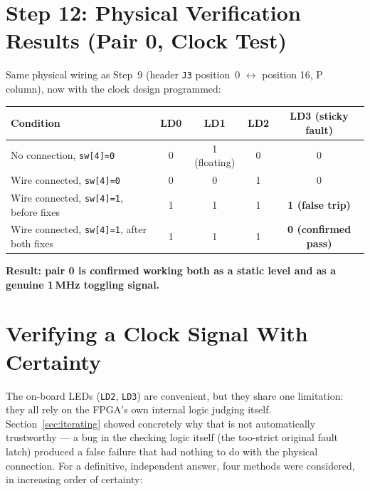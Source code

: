 \documentclass[11pt]{article}
\begin{document}
\section{Step 12: Physical Verification Results (Pair 0, Clock Test)}

Same physical wiring as Step~9 (header \texttt{J3} position~0 $\leftrightarrow$ position
16, P column), now with the clock design programmed:

\begin{center}
\begin{tabular}{@{}lcccc@{}}
\toprule
\textbf{Condition} & \textbf{LD0} & \textbf{LD1} & \textbf{LD2} & \textbf{LD3 (sticky fault)} \\
\midrule
No connection, \texttt{sw[4]=0} & 0 & 1 (floating) & 0 & 0 \\
Wire connected, \texttt{sw[4]=0} & 0 & 0 & 1 & 0 \\
Wire connected, \texttt{sw[4]=1}, before fixes & 1 & 1 & 1 & \textbf{1 (false trip)} \\
Wire connected, \texttt{sw[4]=1}, after both fixes & 1 & 1 & 1 & \textbf{0 (confirmed pass)} \\
\bottomrule
\end{tabular}
\end{center}

\textbf{Result: pair 0 is confirmed working both as a static level and as a genuine
1\,MHz toggling signal.}

\section{Verifying a Clock Signal With Certainty}
\label{sec:certainty}

The on-board LEDs (\texttt{LD2}, \texttt{LD3}) are convenient, but they share one
limitation: they all rely on the FPGA's own internal logic judging itself.
Section~\ref{sec:iterating} showed concretely why that is not automatically trustworthy --- a bug in the checking
logic itself (the too-strict original fault latch) produced a false failure that had
nothing to do with the physical connection. For a definitive, independent answer, four
methods were considered, in increasing order of certainty:
\end{document}
